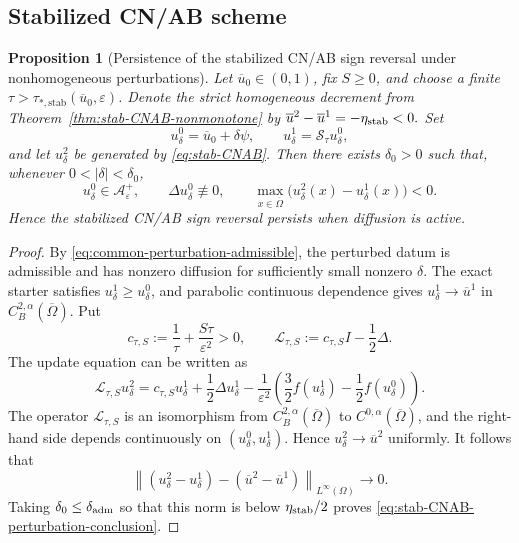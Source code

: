 \documentclass[final, 3p, times]{elsarticle}%
\newcommand{\eps}{\varepsilon}
\newcommand{\Aepsp}{\mathcal A_\varepsilon^+}
\newcommand{\Aeps}{\Aepsp}
\newtheorem{proposition}[theorem]{Proposition}
\begin{document}
\subsection{Stabilized CN/AB scheme}
\label{sec:stab-CNAB-nonhomogeneous-persistence}

\begin{proposition}[Persistence of the stabilized CN/AB sign reversal under nonhomogeneous perturbations]
\label{prop:stab-CNAB-nonhomogeneous-persistence}
Let $\overline u_0\in(0,1)$, fix $S\ge0$, and choose a finite
$\tau>\tau_{*,\mathrm{stab}}(\overline u_0,\eps)$. Denote the strict
homogeneous decrement from Theorem~\ref{thm:stab-CNAB-nonmonotone} by
$\overline u^2-\overline u^1=-\eta_{\rm stab}<0.$
Set
\[
    u^0_\delta=\overline u_0+\delta\psi,
    \qquad
    u^1_\delta=\mathcal S_\tau u^0_\delta,
\]
and let $u^2_\delta$ be generated by \eqref{eq:stab-CNAB}. Then there
exists $\delta_0>0$ such that, whenever $0<|\delta|<\delta_0$,
\begin{equation}
    u^0_\delta\in\Aeps,
    \qquad
    \Delta u^0_\delta\not\equiv0,
    \qquad
    \max_{x\in\overline\Omega}
    \bigl(u^2_\delta(x)-u^1_\delta(x)\bigr)<0.
\label{eq:stab-CNAB-perturbation-conclusion}
\end{equation}
Hence the stabilized CN/AB sign reversal persists when diffusion is active.
\end{proposition}

\begin{proof}
By \eqref{eq:common-perturbation-admissible}, the perturbed datum is
admissible and has nonzero diffusion for sufficiently small nonzero
$\delta$. The exact starter satisfies $u^1_\delta\ge u^0_\delta$, and
parabolic continuous dependence gives
$u^1_\delta\to\overline u^1$ in
$C_B^{2,\alpha}(\overline\Omega)$.
Put
\[
    c_{\tau,S}:=\frac1\tau+\frac{S\tau}{\eps^2}>0,
    \qquad
    \mathcal L_{\tau,S}:=c_{\tau,S}I-\frac12\Delta.
\]
The update equation can be written as
\[
\mathcal L_{\tau,S}u^2_\delta
=c_{\tau,S}u^1_\delta+\frac12\Delta u^1_\delta
-\frac1{\eps^2}
\left(\frac32f(u^1_\delta)-\frac12f(u^0_\delta)\right).
\]
The operator $\mathcal L_{\tau,S}$ is an isomorphism from
$C_B^{2,\alpha}(\overline\Omega)$ to
$C^{0,\alpha}(\overline\Omega)$, and the right-hand side depends
continuously on $(u^0_\delta,u^1_\delta)$. Hence
$u^2_\delta\to\overline u^2$ uniformly. It follows that
\[
    \left\|(u^2_\delta-u^1_\delta)
    -(\overline u^2-\overline u^1)\right\|_{L^\infty(\Omega)}
    \longrightarrow0.
\]
Taking $\delta_0\le\delta_{\rm adm}$ so that this norm is below
$\eta_{\rm stab}/2$ proves
\eqref{eq:stab-CNAB-perturbation-conclusion}.
\end{proof}
\end{document}
